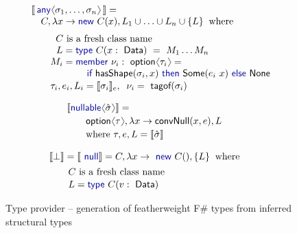 \documentclass[10pt,preprint,blind,clearpagebib]{sigplanconf}
\newcommand{\langl}{\begin{picture}(4.5,7)
\put(1.1,2.5){\rotatebox{60}{\line(1,0){5.5}}}
\put(1.1,2.5){\rotatebox{300}{\line(1,0){5.5}}}
\end{picture}}
\newcommand{\rangl}{\begin{picture}(4.5,7)
\put(.9,2.5){\rotatebox{120}{\line(1,0){5.5}}}
\put(.9,2.5){\rotatebox{240}{\line(1,0){5.5}}}
\end{picture}}
\newcommand{\kvd}[1]{\textnormal{\textcolor{kvdclr}{\sffamily #1}}}
\newcommand{\ident}[1]{\textnormal{\sffamily #1}}
\newcommand{\tytagof}{\ident{tagof}}
\newcommand{\sem}[1]{\llbracket #1 \rrbracket}
\begin{document}
\begin{figure}
\begin{multicols}{2}
\noindent
\begin{equation*}
\begin{array}{l}
 \sem{\,\kvd{any}\langl\sigma_1, \ldots, \sigma_n\rangl\,} = \\
 \quad C, \lambda x\rightarrow\kvd{new}~C(x), L_1\cup\ldots\cup L_n\cup\{ L \}\;\;\textnormal{where}\\[0.6em]
 \qquad \;\;C~\textnormal{is a fresh class name} \\
 \qquad \;\,\,L = \kvd{type}~C(x:\ident{Data})~=~M_1\ldots M_n \\
 \qquad M_i = \kvd{member}~\nu_i:\ident{option}\langl\tau_i\rangl=\\
 \hspace{5.8em}  \kvd{if}~\ident{hasShape}(\sigma_i, x)~\kvd{then}~ \ident{Some}(e_i~x)~\kvd{else}~\ident{None} \\[0.1em]
 \qquad \tau_i, e_i, L_i = \sem{\sigma_i}_e,\;\; \nu_i=\tytagof{(\sigma_i)}
\end{array}
\end{equation*}
\vspace{-2em}

\begin{equation*}
\hspace{-1.3em}
\begin{array}{l}
 \sem{\kvd{nullable}\langl\hat{\sigma}\rangl} = \\[0.2em]
 \qquad \ident{option}\langl\tau\rangl, \lambda x \rightarrow \ident{convNull}(x,e), L\\[0.2em] 
 \qquad \textnormal{where}~\tau, e, L = \sem{\hat{\sigma}}
\end{array}
\end{equation*}
\vspace{-2em}

\begin{equation*}
\hspace{-1.3em}
\begin{array}{l}
 \sem{\bot} = \sem{\kvd{null}} = C, \lambda x\rightarrow \kvd{new}~C(), \{ L \} \;\;\textnormal{where}\\[0.4em]
 \qquad C~\textnormal{is a fresh class name} \\[0.1em]
 \qquad L = \kvd{type}~C(v:\ident{Data})
\end{array}
\end{equation*}
\end{multicols}

\caption{Type provider -- generation of featherweight F\# types from inferred structural types}
\label{fig:tp-generation}
\vspace{-0.5em}
\end{figure}
\end{document}
